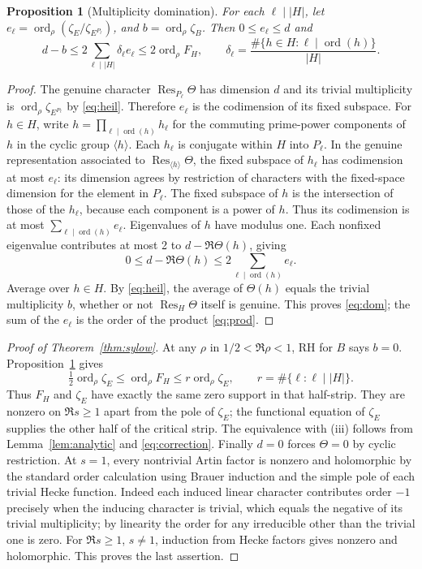 \documentclass[11pt]{article}
\newtheorem{proposition}[theorem]{Proposition}
\theoremstyle{remark}\newtheorem{remark}[theorem]{Remark}
\newcommand{\ord}{\operatorname{ord}}
\newcommand{\Res}{\operatorname{Res}}
\begin{document}
\begin{proposition}[Multiplicity domination]\label{prop:dom}
For each $\ell\mid|H|$, let $e_\ell=\ord_\rho(\zeta_E/\zeta_{E^{P_\ell}})$, and $b=\ord_\rho\zeta_B$. Then $0\le e_\ell\le d$ and
\begin{equation}\label{eq:dom}
 d-b\le 2\sum_{\ell\mid|H|}\delta_\ell e_\ell\le 2\ord_\rho F_H,
 \qquad \delta_\ell=\frac{\#\{h\in H:\ell\mid\ord(h)\}}{|H|}.
\end{equation}
\end{proposition}
\begin{proof}
The genuine character $\Res_{P_\ell}\Theta$ has dimension $d$ and its trivial multiplicity is $\ord_\rho\zeta_{E^{P_\ell}}$ by \eqref{eq:heil}. Therefore $e_\ell$ is the codimension of its fixed subspace. For $h\in H$, write $h=\prod_{\ell\mid\ord(h)} h_\ell$ for the commuting prime-power components of $h$ in the cyclic group $\langle h\rangle$. Each $h_\ell$ is conjugate within $H$ into $P_\ell$. In the genuine representation associated to $\Res_{\langle h\rangle}\Theta$, the fixed subspace of $h_\ell$ has codimension at most $e_\ell$: its dimension agrees by restriction of characters with the fixed-space dimension for the element in $P_\ell$. The fixed subspace of $h$ is the intersection of those of the $h_\ell$, because each component is a power of $h$. Thus its codimension is at most $\sum_{\ell\mid\ord(h)}e_\ell$. Eigenvalues of $h$ have modulus one. Each nonfixed eigenvalue contributes at most 2 to $d-\Re\Theta(h)$, giving
\[
 0\le d-\Re\Theta(h)\le2\sum_{\ell\mid\ord(h)}e_\ell.
\]
Average over $h\in H$. By \eqref{eq:heil}, the average of $\Theta(h)$ equals the trivial multiplicity $b$, whether or not $\Res_H\Theta$ itself is genuine. This proves \eqref{eq:dom}; the sum of the $e_\ell$ is the order of the product \eqref{eq:prod}.
\end{proof}
\begin{proof}[Proof of Theorem~\ref{thm:sylow}]
At any $\rho$ in $1/2<\Re\rho<1$, RH for $B$ says $b=0$. Proposition~\ref{prop:dom} gives
\begin{equation}\label{eq:mult}
 \tfrac12\ord_\rho\zeta_E\le\ord_\rho F_H\le r\ord_\rho\zeta_E,\qquad r=\#\{\ell:\ell\mid|H|\}.
\end{equation}
Thus $F_H$ and $\zeta_E$ have exactly the same zero support in that half-strip. They are nonzero on $\Re s\ge1$ apart from the pole of $\zeta_E$; the functional equation of $\zeta_E$ supplies the other half of the critical strip. The equivalence with (iii) follows from Lemma~\ref{lem:analytic} and \eqref{eq:correction}. Finally $d=0$ forces $\Theta=0$ by cyclic restriction. At $s=1$, every nontrivial Artin factor is nonzero and holomorphic by the standard order calculation using Brauer induction and the simple pole of each trivial Hecke function. Indeed each induced linear character contributes order $-1$ precisely when the inducing character is trivial, which equals the negative of its trivial multiplicity; by linearity the order for any irreducible other than the trivial one is zero. For $\Re s\ge1$, $s\ne1$, induction from Hecke factors gives nonzero and holomorphic. This proves the last assertion.
\end{proof}
\end{document}
